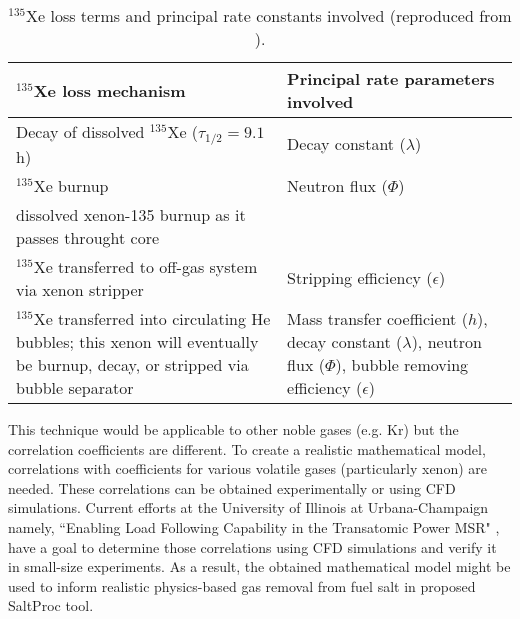 \begin{table}[ht!]
\caption{$^{135}$Xe loss terms and principal rate constants involved
 (reproduced from \cite{kedl_development_1967}).}
  \centering
\begin{tabularx}{\textwidth}{b | b}
\hline \textbf{$^{135}$Xe loss mechanism}      & \textbf{Principal rate 
parameters involved}  	\\
\hline Decay of dissolved $^{135}$Xe ($\tau_{1/2}=9.1$ h)  & Decay constant	($\lambda$)		\\
\hline $^{135}$Xe burnup              &  Neutron flux ($\Phi$)		 					\\
dissolved xenon-135 burnup as it passes throught core  & 			            \\		\hline $^{135}$Xe transferred to off-gas system via xenon stripper & Stripping efficiency ($\epsilon$)		\\
\hline $^{135}$Xe transferred into circulating He bubbles; this xenon will eventually be burnup, decay, or stripped via bubble separator & Mass transfer coefficient ($h$), decay constant ($\lambda$), 
neutron flux ($\Phi$), bubble removing efficiency ($\epsilon$)		\\
\hline 
\end{tabularx}
  		\label{tab:xe_loss}
\end{table}

This technique would be applicable to other noble gases (e.g. Kr) but the 
correlation coefficients are different. 
To create a realistic mathematical model, correlations with 
coefficients for various volatile gases (particularly xenon) are needed. These 
correlations can be obtained experimentally or using CFD simulations. 
Current efforts at the University of Illinois at Urbana-Champaign namely, ``Enabling 
Load Following Capability in the Transatomic Power MSR" \cite{huff_enabling_2018}, 
have a goal to determine those correlations using CFD simulations 
and verify it in small-size experiments. 
As a result, the obtained mathematical model might be used to inform realistic 
physics-based gas removal from fuel salt in proposed SaltProc tool.

